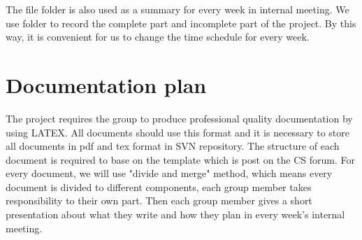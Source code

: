 \documentclass[11pt, a4paper]{report}
\begin{document}
The file folder is also used as a summary for every week in internal meeting. We use folder to record the complete part and incomplete part of the project. By this way, it is convenient for us to change the time schedule for every week.   

\section{Documentation plan}
The project requires the group to produce professional quality documentation by using LATEX. All documents should use this format and it is necessary to store all documents in pdf and tex format in SVN repository. The structure of each document is required to base on the template which is post on the CS forum. For every document, we will use "divide and merge" method, which means every document is divided to different components, each group member takes responsibility to their own part. Then each group member gives a short presentation about what they write and how they plan in every week's internal meeting.
\end{document}
